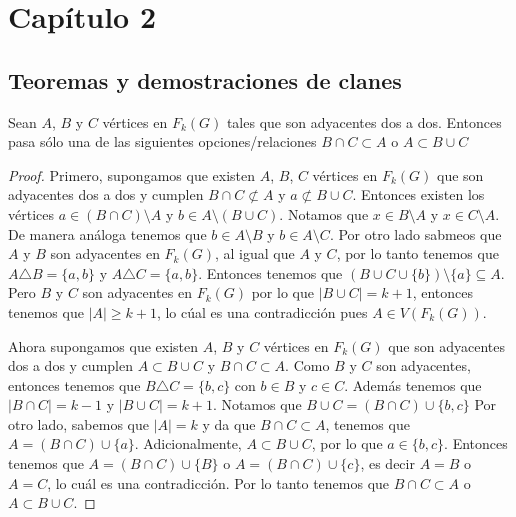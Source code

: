 \chapter{Cap\'i{}tulo 2}%
\label{cap:ejemplos}

\section{Teoremas y demostraciones de clanes}%
\label{sec:etiquetas}


\begin{lema}%
        \label{lem:primero}
        Sean $A$, $B$ y $C$ v\'ertices en $F_k(G)$ tales que son adyacentes
        dos a dos. Entonces pasa s\'olo una de las siguientes
        opciones/relaciones $B \cap C \subset A$ o $A \subset B \cup C$
        \end{lema}

    
    \begin{proof}
        Primero, supongamos que existen $A$, $B$, $C$ v\'ertices en $F_k(G)$ que
        son adyacentes dos a dos y cumplen $B \cap C \not\subset A$ y $a
        \not\subset B \cup C$. Entonces existen los v\'ertices $a \in (B \cap
        C)\setminus A$ y $b \in A \setminus (B \cup C)$. Notamos que $x \in B
        \setminus A$ y $x \in C \setminus A$. De manera an\'aloga tenemos que $b
        \in A \setminus B$ y $b \in A \setminus C$. Por otro lado sabmeos que
        $A$ y $B$ son adyacentes en $F_k(G)$, al igual que $A$ y $C$, por lo
        tanto tenemos que $A \triangle B = \{a,b\}$ y $A \triangle C = \{a,
        b\}$. Entonces tenemos que $(B \cup C \cup \{b\})\setminus \{a\}
        \subseteq A$. Pero $B$ y $C$ son adyacentes en $F_k(G)$ por lo que $|B
        \cup C| = k+1$, entonces tenemos que $|A| \geq k+1$, lo c\'ual es una
        contradicci\'on pues $A \in V (F_k(G))$. 

        Ahora supongamos que existen $A$, $B$ y $C$ v\'ertices en $F_k(G)$ que
        son adyacentes dos a dos y cumplen $A \subset B \cup C$ y $B \cap C
        \subset A$. Como $B$ y $C$ son adyacentes, entonces tenemos que $B
        \triangle C = \{b,c\}$ con $b \in B$ y $c \in C$. Adem\'as tenemos que
        $|B \cap C| = k-1$ y $|B \cup C| = k +1$. Notamos que $B \cup C = (B\cap
        C) \cup \{b,c\}$ Por otro lado, sabemos que $|A|=k$ y da que $B \cap C
        \subset A$, tenemos que $A = (B \cap C) \cup \{a\}$. Adicionalmente, $A
        \subset B \cup C$, por lo que $a \in \{b, c\}$. Entonces tenemos que $A
        = (B \cap C) \cup \{B\}$ o $A = (B \cap C) \cup \{c\}$, es decir $A = B$
        o $A=C$, lo cu\'al es una contradicci\'on. Por lo tanto tenemos que $B
        \cap C \subset A$ o $A \subset B \cup C$.
    \end{proof}